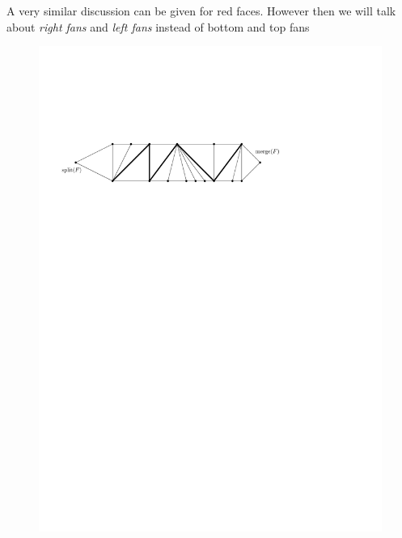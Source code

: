        A very similar discussion can be given for red faces. However then we will talk about \emph{right fans} and \emph{left fans} instead of bottom and top fans

       \begin{figure}[h]
         \centering
         \includegraphics[scale=.9]{rectangularDuals/img/fans}
         \caption{}
         \label{fig:uni:fans}
       \end{figure}

